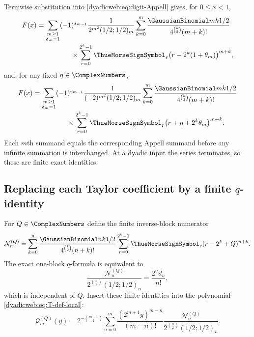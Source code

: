 \documentclass[11pt,oneside]{article}
\theoremstyle{definition}
\theoremstyle{remark}
\begin{document}
Termwise substitution into \eqref{dyadicweb:eq:digit-Appell} gives, for $0\le x<1$,
\begin{align}
 F(x)&=\sum_{\substack{m\ge1\\\delta_m=1}}
 (-1)^{s_{m-1}}
 \frac1{2^{m^2}(1/2;1/2)_m}
 \sum_{k=0}^{m}\frac{\GaussianBinomial mk{1/2}}{4^{\binom k2}(m+k)!}\notag\\[-0.2em]
 &\hspace{5em}\times
 \sum_{r=0}^{2^k-1}\ThueMorseSignSymbol_r\bigl(r-2^k(1+\theta_m)\bigr)^{m+k},
 \label{dyadicq:eq:centered-digit-q}
\end{align}
and, for any fixed $\eta\in\ComplexNumbers$,
\begin{align}
 F(x)&=\sum_{\substack{m\ge1\\\delta_m=1}}
 (-1)^{s_{m-1}}
 \frac1{(-2)^{m^2}(1/2;1/2)_m}
 \sum_{k=0}^{m}\frac{\GaussianBinomial mk{1/2}}{4^{\binom k2}(m+k)!}\notag\\[-0.2em]
 &\hspace{5em}\times
 \sum_{r=0}^{2^k-1}\ThueMorseSignSymbol_r\bigl(r+\eta+2^k\theta_m\bigr)^{m+k}.
 \label{dyadicq:eq:raw-digit-q}
\end{align}
Each $m$th summand equals the corresponding Appell summand before any infinite summation is
interchanged.  At a dyadic input the series terminates, so these are finite exact identities.

\subsection[Replacing each Taylor coefficient by a finite q-identity]{Replacing each Taylor coefficient by a finite $q$-identity}

For $Q\in\ComplexNumbers$ define the finite inverse-block numerator
\begin{equation}
 \mathcal N_n^{(Q)}=
 \sum_{k=0}^{n}
 \frac{\GaussianBinomial nk{1/2}}{4^{\binom k2}(n+k)!}
 \sum_{r=0}^{2^k-1}\ThueMorseSignSymbol_r(r-2^k+Q)^{n+k}.                  \label{dyadicweb:eq:NnQ-local}
\end{equation}
The exact one-block $q$-formula is equivalent to
\begin{equation}
 \frac{\mathcal N_n^{(Q)}}
 {2^{\binom n2}(1/2;1/2)_n}
 =\frac{2^nd_n}{n!},                                      \label{dyadicweb:eq:NnQ-normalization-local}
\end{equation}
which is independent of $Q$.  Insert these finite identities into the polynomial
\eqref{dyadicweb:eq:T-def-local}:
\begin{equation}
 \mathcal Q_m^{(Q)}(y)=
 2^{-\binom{m+1}{2}}
 \sum_{n=0}^{m}
 \frac{(2^{m+1}y)^{m-n}}{(m-n)!}
 \frac{\mathcal N_n^{(Q)}}
 {2^{\binom n2}(1/2;1/2)_n}.                              \label{dyadicweb:eq:QmQ-local}
\end{equation}
\end{document}
